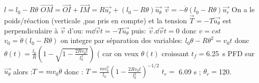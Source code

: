 \begin{Answer}
	\Question $l = l_0 - R\theta$
	\Question $\vec{OM} = \vec{OI}+\vec{IM}=R\vec{u_r}+(l_0-R\theta)\vec{u_\theta}$
	\Question $\vec{v}=-\dot{\theta}(l_0-R\theta)\vec{u_r}$
	\Question On a le poids/réaction (verticale ,pas pris en compte) et la tension $\vec{T}=-T\vec{u_\theta}$ est perpendiculaire à $\vec{v}$ d'ou: $m\dd{\vec{v}}{t}=-T\vec{u_\theta}$ puis: $\vec{v}.\dd{\vec{v}}{t}=0$ donc $v=cst$
	\Question $v_0 = \dot{\theta}(l_0-R\theta)$
	\Question on integre par séparation des variables: $l_0\theta - R\theta^2=v_0t$ donc
	$\boxed{\theta(t)=\frac{l_0}{R}\left(1-\sqrt{1-\frac{2Rv_0t}{l_0^2}}\right)}$
	( car on veux $\theta(t)$ croissant
	\Question $t_f=$\SI{6.25}{s}
	\Question \subQuestion PFD sur $\vec{u_\theta}$ alors :$T=mv_0\dot{\theta}$ donc :
	$\boxed{T= \frac{mv_0^2}{l_0} \left(1-\frac{2Rv_0t}{l_0^2}\right)^{-1/2}}$
	\subQuestion $t_r=$ 6.09 s ; $\theta_r=$\SI{120}{\deg}.
\end{Answer}
